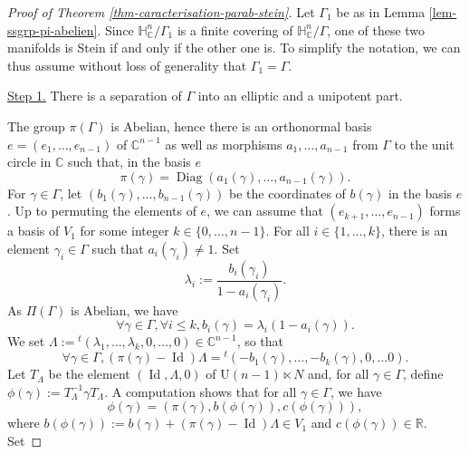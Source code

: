 \documentclass{article}
\theoremstyle{definition}
\theoremstyle{remark}
\newcommand{\C}{\mathbb{C}}
\newcommand{\R}{\mathbb{R}}
\newcommand{\HNC}{\mathbb{H}^{n}_{\C}}
\DeclareMathOperator{\Id}{\text{Id}}
\begin{document}
	\begin{proof}[Proof of Theorem \ref{thm-caracterisation-parab-stein}] Let $\Gamma_1$ be as in Lemma \ref{lem-ssgrp-pi-abelien}. Since $\HNC/\Gamma_1$ is a finite covering of $\HNC/\Gamma$, one of these two manifolds is Stein if and only if the other one is. To simplify the notation, we can thus assume without loss of generality that $\Gamma_1=\Gamma$.
		
		\underline{Step 1.} There is a separation of $\Gamma$ into an elliptic and a unipotent part.
		
		 The group $\pi(\Gamma)$ is Abelian, hence there is an orthonormal basis $e=(e_1,\dots,e_{n-1})$ of $\C^{n-1}$ as well as morphisms $a_1,\dots,a_{n-1}$ from $\Gamma$ to the unit circle in $\C$ such that, in the basis $e$
		\begin{equation*}
			\pi(\gamma) = \operatorname{Diag}(a_1(\gamma),\dots,a_{n-1}(\gamma)).
		\end{equation*}
		For $\gamma \in \Gamma$, let $(b_1(\gamma),\dots,b_{n-1}(\gamma))$ be the coordinates of $b(\gamma)$ in the basis $e$.
		Up to permuting the elements of $e$, we can assume that $(e_{k+1},\dots,e_{n-1})$ forms a basis of $V_1$ for some integer $k\in \{0,\dots,n-1\}$. For all $i\in \{1,\dots,k\}$, there is an element $\gamma_i \in \Gamma$ such that $a_i(\gamma_i)\ne 1$. Set
		\begin{equation*}
			\lambda_i := \frac{b_i(\gamma_i)}{1-a_i(\gamma_i)}.
		\end{equation*}
		As $\Pi(\Gamma)$ is Abelian, we have
		\begin{equation*}
			\forall \gamma \in \Gamma, \forall i\le k, b_i(\gamma)=\lambda_i(1-a_i(\gamma)).
		\end{equation*}
		We set $\Lambda := {}^{t}(\lambda_1,\dots,\lambda_k,0,\dots,0) \in \C^{n-1}$, so that
		\begin{equation*}
			\forall \gamma \in \Gamma, (\pi(\gamma)-\Id)\Lambda = {}^{t}(-b_1(\gamma),\dots,-b_k(\gamma),0,\dots 0).
		\end{equation*}
		Let $T_{\Lambda}$ be the element $(\Id,\Lambda,0)$ of $\mathrm{U}(n-1)\ltimes N$ and, for all $\gamma \in \Gamma$, define $\phi(\gamma) :=T_{\Lambda}^{-1}\gamma T_{\Lambda}$. A computation shows that for all $\gamma\in \Gamma$, we have
		\begin{equation*}
			\phi(\gamma) = (\pi(\gamma),b(\phi(\gamma)),c(\phi(\gamma))),
		\end{equation*}
		where $b(\phi(\gamma)) := b(\gamma) + (\pi(\gamma)-\Id)\Lambda \in V_1$ and $c(\phi(\gamma)) \in \R$. Set

\end{proof}
\end{document}
